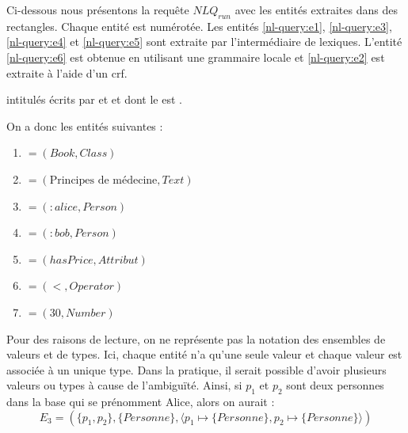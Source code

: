 \begin{example}
    \label{ex:nl-query:simpleEnts}
    Ci-dessous nous présentons la requête $NLQ_{run}$ avec les entités extraites dans des rectangles.
    Chaque entité est numérotée.
    Les entités \ref{nl-query:e1}, \ref{nl-query:e3}, \ref{nl-query:e4} et \ref{nl-query:e5} sont extraite par l'intermédiaire de lexiques.
    L'entité \ref{nl-query:e6} est obtenue en utilisant une grammaire locale et \ref{nl-query:e2} est extraite à l'aide d'un \gls{crf}.

    \begin{displayquote}
         intitulés  écrits par  et  et dont le  est  .
    \end{displayquote}

    \noindent
    On a donc les entités suivantes :
    \begin{multicols}{2}
        \begin{enumerate}[label=$E_{\arabic*}$]
            \item \label{nl-query:e1} $= (Book, Class)$
            \item \label{nl-query:e2} $= (\text{Principes de médecine}, Text)$
            \item \label{nl-query:e3} $= (:alice, Person)$
            \item \label{nl-query:e4} $= (:bob, Person)$
            \item \label{nl-query:e5} $= (hasPrice, Attribut)$
            \item \label{nl-query:e6} $= (<, Operator)$
            \item \label{nl-query:e7} $= (30, Number)$
        \end{enumerate}
    \end{multicols}

    Pour des raisons de lecture, on ne représente pas la notation des ensembles de valeurs et de types.
    Ici, chaque entité n'a qu'une seule valeur et chaque valeur est associée à un unique type.
    Dans la pratique, il serait possible d'avoir plusieurs valeurs ou types à cause de l'ambiguïté.
    Ainsi, si $p_1$ et $p_2$ sont deux personnes dans la base qui se prénomment Alice, alors on aurait :
    \begin{equation*}
        E_3 = (\{p_1, p_2\}, \{Personne\}, \langle p_1 \mapsto \{Personne\}, p_2 \mapsto \{Personne\} \rangle)
    \end{equation*}
\end{example}

